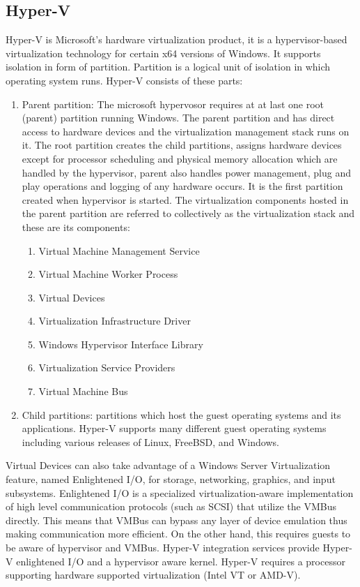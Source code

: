 \subsection{Hyper-V}
Hyper-V is Microsoft's hardware virtualization product, it is a hypervisor-based virtualization technology for certain x64 versions of Windows. It supports isolation in form of partition. Partition is a logical unit of isolation in which operating system runs. 
Hyper-V consists of these parts:
\begin{enumerate}
\item Parent partition: The microsoft hypervosor requires at at last one root (parent) partition running Windows. The parent partition and has direct access to hardware devices and the virtualization management stack runs on it. The root partition creates the child partitions, assigns hardware devices except for processor scheduling and physical memory allocation which are handled by the hypervisor, parent also handles power management, plug and play operations and logging of any hardware occurs. It is the first partition created when hypervisor is started. The virtualization components hosted in the parent partition are referred to collectively as the virtualization stack and these are its components:
\begin{enumerate}
\item Virtual Machine Management Service
\item Virtual Machine Worker Process
\item Virtual Devices
\item Virtualization Infrastructure Driver
\item Windows Hypervisor Interface Library
\item Virtualization Service Providers
\item Virtual Machine Bus
\end{enumerate}
\item Child partitions: partitions which host the guest operating systems and its applications. Hyper-V supports many different guest operating systems including various releases of Linux, FreeBSD, and Windows.
\end{enumerate}
Virtual Devices can also take advantage of a Windows Server Virtualization feature, named Enlightened I/O, for storage, networking, graphics, and input subsystems. Enlightened I/O is a specialized virtualization-aware implementation of high level communication protocols (such as SCSI) that utilize the VMBus directly. This means that VMBus can bypass any layer of device emulation thus making communication more efficient. On the other hand, this requires guests to be aware of hypervisor and VMBus. Hyper-V integration services provide Hyper-V enlightened I/O and a hypervisor aware kernel. Hyper-V requires a processor supporting hardware supported virtualization (Intel VT or AMD-V).

